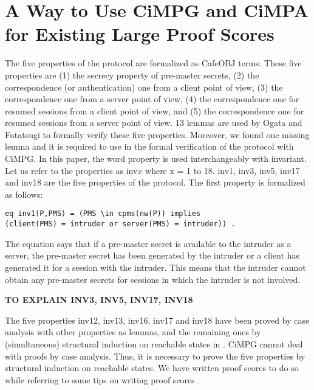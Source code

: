 \documentclass[a4paper,fleqn]{cas-dc}
\begin{document}
\section{A Way to Use CiMPG and CiMPA for Existing Large Proof Scores}\label{fvtls}
The five properties of the protocol \cite{1437139} are formalized as CafeOBJ terms. These five properties are (1) the secrecy property of pre-master secrets, (2) the correspondence (or authentication) one from a client point of view, (3) the correspondence one from a server point of view, (4) the correspondence one for resumed sessions from a client point of view, and (5) the correspondence one for resumed sessions from a server point of view. 13 lemmas are used by Ogata and Futatsugi to formally verify these five properties. Moreover, we found one missing lemma and it is required to use in the formal verification of the protocol with CiMPG. In this paper, the word property is used interchangeably with invariant. Let us refer to the properties as inv\textbf{$x$} where x = 1 to 18. inv1, inv3, inv5, inv17 and inv18 are the five properties of the protocol. The first property is formalized as follows: 
\begin{small}
\begin{verbatim}
eq inv1(P,PMS) = (PMS \in cpms(nw(P)) implies 
(client(PMS) = intruder or server(PMS) = intruder)) .
\end{verbatim}
\end{small}
The equation says that if a pre-master secret is available to the intruder as a server, the pre-master secret has been generated by the intruder or a client has generated it for a session with the intruder. This means that the intruder cannot obtain any pre-master secrets for sessions in which the intruder is not involved. 

\textbf{TO EXPLAIN INV3, INV5, INV17, INV18}

The five properties inv12, inv13, inv16, inv17 and inv18 have been proved by case analysis with other properties as lemmas, and the remaining ones by (simultaneous) structural induction on reachable states in \cite{1437139}. CiMPG cannot deal with proofs by case analysis. Thus, it is necessary to prove the five properties by structural induction on reachable states. We have written proof scores to do so while referring to some tips on writing proof scores \cite{Ogata2006}.
\end{document}
